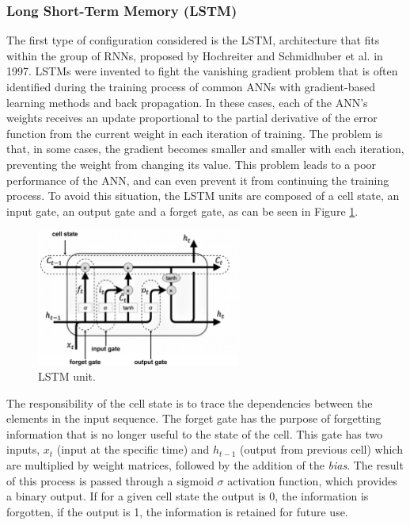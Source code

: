 \subsubsection{Long Short-Term Memory (LSTM)}\label{chap3:subsubsec:lstm}

The first type of configuration considered is the \ac{LSTM}, architecture that fits within the group of \ac{RNN}s, proposed by Hochreiter and Schmidhuber et al. \cite{lstm0} in 1997. \ac{LSTM}s were invented to fight the vanishing gradient problem that is often identified during the training process of common \ac{ANN}s with gradient-based learning methods and back propagation. In these cases, each of the \ac{ANN}'s weights receives an update proportional to the partial derivative of the error function from the current weight in each iteration of training. The problem is that, in some cases, the gradient becomes smaller and smaller with each iteration, preventing the weight from changing its value. This problem leads to a poor performance of the \ac{ANN}, and can even prevent it from continuing the training process. To avoid this situation, the \ac{LSTM} units are composed of a cell state, an input gate, an output gate and a forget gate, as can be seen in Figure \ref{lstm}.

\begin{figure}[h!]
    \centering
    \begin{center}
    \includegraphics[width=0.6\textwidth]{Images/LSTM_cell_detailed.png}
    \caption{LSTM unit.}
    \label{lstm}
    \end{center}
\end{figure}

The responsibility of the cell state is to trace the dependencies between the elements in the input sequence. The forget gate has the purpose of forgetting information that is no longer useful to the state of the cell. This gate has two inputs, $x_t$ (input at the specific time) and $h_{t-1}$ (output from previous cell) which are multiplied by weight matrices, followed by the addition of the \textit{bias}. The result of this process is passed through a sigmoid $\sigma$ activation function, which provides a binary output. If for a given cell state the output is 0, the information is forgotten, if the output is 1, the information is retained for future use.

